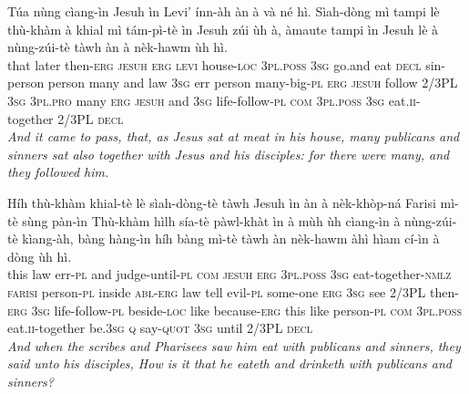 \documentclass[11pt,a4paper]{article}
\begin{document}
\begin{exe}
\gll Túa nùng cìang-ìn Jesuh ìn Levi' ínn-àh àn à và né hì. Sìah-dòng mì tampi lè thù-khàm à khial mì tám-pì-tè ìn Jesuh zúi ùh à, àmaute tampi ìn Jesuh lè à nùng-zúi-tè tàwh àn à nèk-hawm ùh hì. \\
     that later then-\textsc{erg} \textsc{jesuh} \textsc{erg} \textsc{levi} house-\textsc{loc} \textsc{3pl}.\textsc{poss} \textsc{3sg} go.and eat \textsc{decl} sin-person person many and law \textsc{3sg} err person many-big-\textsc{pl} \textsc{erg} \textsc{jesuh} follow 2/3PL \textsc{3sg} \textsc{3pl}.\textsc{pro} many \textsc{erg} \textsc{jesuh} and \textsc{3sg} life-follow-\textsc{pl} \textsc{com} \textsc{3pl}.\textsc{poss} \textsc{3sg} eat.\textsc{ii}-together 2/3PL \textsc{decl} \\
\glt \textcolor{kjvcolor}{\textit{And it came to pass, that, as Jesus sat at meat in his house, many publicans and sinners sat also together with Jesus and his disciples: for there were many, and they followed him.}}

\gll Híh thù-khàm khial-tè lè sìah-dòng-tè tàwh Jesuh ìn àn à nèk-khòp-ná Farisi mì-tè sùng pàn-ìn Thù-khàm hìlh sía-tè pàwl-khàt ìn à mùh ùh cìang-ìn à nùng-zúi-tè kìang-àh, bàng hàng-ìn híh bàng mì-tè tàwh àn nèk-hawm àhì hìam cí-ìn à dòng ùh hì. \\
     this law err-\textsc{pl} and judge-until-\textsc{pl} \textsc{com} \textsc{jesuh} \textsc{erg} \textsc{3pl}.\textsc{poss} \textsc{3sg} eat-together-\textsc{nmlz} \textsc{farisi} person-\textsc{pl} inside \textsc{abl}-\textsc{erg} law tell evil-\textsc{pl} some-one \textsc{erg} \textsc{3sg} see 2/3PL then-\textsc{erg} \textsc{3sg} life-follow-\textsc{pl} beside-\textsc{loc} like because-\textsc{erg} this like person-\textsc{pl} \textsc{com} \textsc{3pl}.\textsc{poss} eat.\textsc{ii}-together be.\textsc{3sg} \textsc{q} say-\textsc{quot} \textsc{3sg} until 2/3PL \textsc{decl} \\
\glt \textcolor{kjvcolor}{\textit{And when the scribes and Pharisees saw him eat with publicans and sinners, they said unto his disciples, How is it that he eateth and drinketh with publicans and sinners?}}


\end{exe}
\end{document}

